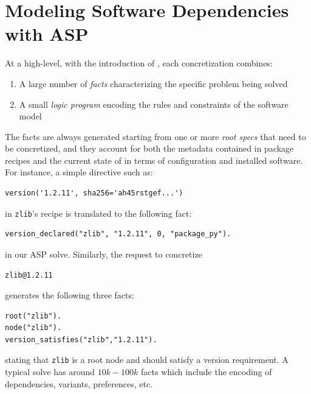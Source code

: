 \section{Modeling Software Dependencies with ASP}
\label{sec:asp-model}

At a high-level, with the introduction of \clingo, each concretization
combines:
\begin{enumerate}
\item A large number of \emph{facts} characterizing the specific problem being solved
\item A small \emph{logic program} encoding the rules and constraints of the software model
\end{enumerate}
The facts are always generated starting from one or more
\emph{root specs} that need to be concretized, and they account
for both the metadata contained in package recipes and the
current state of \spack{} in terms of configuration and
installed software.
For instance, a simple directive such as:

\begin{verbatim}
version('1.2.11', sha256='ah45rstgef...')
\end{verbatim}

in \texttt{zlib}'s recipe is translated to the following fact:

\begin{verbatim}
version_declared("zlib", "1.2.11", 0, "package_py").
\end{verbatim}

in our ASP solve. Similarly, the request to concretize

\begin{verbatim}
zlib@1.2.11
\end{verbatim}

generates the following three facts:

\begin{verbatim}
root("zlib").
node("zlib").
version_satisfies("zlib","1.2.11").
\end{verbatim}

stating that \texttt{zlib} is a root node and should satisfy
a version requirement.
A typical solve has around $10k-100k$ facts which include
the encoding of dependencies, variants, preferences, etc.

